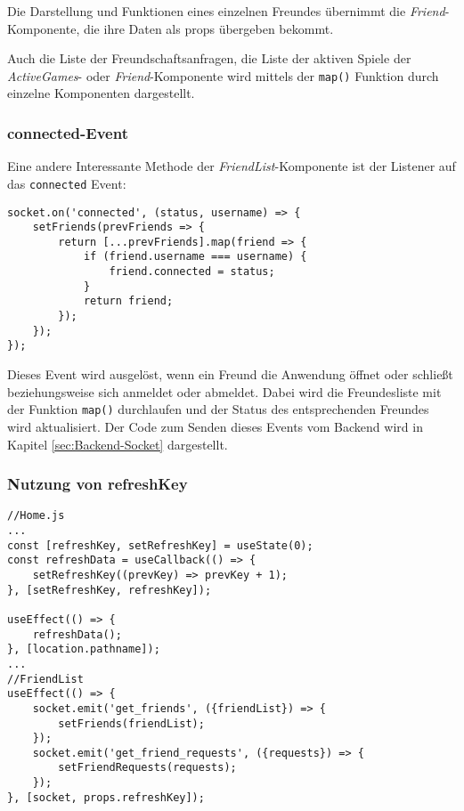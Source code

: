 Die Darstellung und Funktionen eines einzelnen Freundes übernimmt die \textit{Friend}- Komponente, die ihre Daten als props übergeben bekommt.

Auch die Liste der Freundschaftsanfragen, die Liste der aktiven Spiele der \textit{ActiveGames}- oder \textit{Friend}-Komponente wird mittels der \verb|map()| Funktion durch einzelne Komponenten dargestellt.

\subsubsection{connected-Event}
\label{sec:connected}
Eine andere Interessante Methode der \textit{FriendList}-Komponente ist der Listener auf das \verb|connected| Event:

\begin{lstlisting}[style=codeStyle, caption={Der connected Eventlistener der \textit{FriendList}-Komponente}, label={lst:routing-Middlewares}]
socket.on('connected', (status, username) => {
    setFriends(prevFriends => {
        return [...prevFriends].map(friend => {
            if (friend.username === username) {
                friend.connected = status;
            }
            return friend;
        });
    });
});
\end{lstlisting}

Dieses Event wird ausgelöst, wenn ein Freund die Anwendung öffnet oder schließt beziehungsweise sich anmeldet oder abmeldet. Dabei wird die Freundesliste mit der Funktion \verb|map()| durchlaufen und der Status des entsprechenden Freundes wird aktualisiert. Der Code zum Senden dieses Events vom Backend wird in Kapitel \ref{sec:Backend-Socket} dargestellt.


\subsubsection{Nutzung von refreshKey}
\begin{lstlisting}[style=codeStyle, caption={Darstellung der Freundesliste in \textit{FriendList}}, label={lst:FriendList}]
//Home.js
...
const [refreshKey, setRefreshKey] = useState(0);
const refreshData = useCallback(() => {
    setRefreshKey((prevKey) => prevKey + 1);
}, [setRefreshKey, refreshKey]);

useEffect(() => {
    refreshData();
}, [location.pathname]);
...
//FriendList
useEffect(() => {
    socket.emit('get_friends', ({friendList}) => {
        setFriends(friendList);
    });
    socket.emit('get_friend_requests', ({requests}) => {
        setFriendRequests(requests);
    });
}, [socket, props.refreshKey]);
\end{lstlisting}

